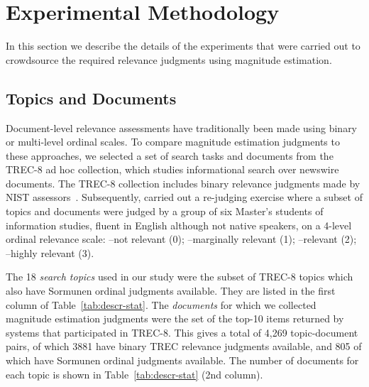 \section{Experimental Methodology}
\label{sec-methods}

In this section we describe the details of the experiments that were
carried out to crowdsource
the required relevance judgments using magnitude estimation.

\subsection{Topics and Documents}

Document-level relevance assessments have traditionally been made using
binary or multi-level ordinal scales.
To compare magnitude estimation judgments to these approaches, we
selected a set of search tasks and documents from the TREC-8 ad hoc
collection, which studies informational search over newswire documents.
The TREC-8 collection includes binary relevance judgments made by
NIST assessors~\cite{VooHar99}. Subsequently, \citet{Sormunen:2002} carried out a
re-judging exercise where a subset of topics and documents were judged
by a group of six Master's students of information studies, fluent in English although not native speakers,
on a 4-level ordinal relevance scale: \nn--not relevant (0);  
\mm--marginally relevant (1); \rr--relevant (2); \hh--highly relevant
(3).

The 18 \emph{search topics} used in our study were the subset of TREC-8 topics
which also have Sormunen ordinal judgments available. 
They are listed in the first column of Table~\ref{tab:descr-stat}.
The \emph{documents} for which we collected magnitude estimation
judgments were the set of the top-10 items returned by systems that
participated in TREC-8.  
This gives a total of 4,269 topic-document pairs, of
which 3881 have binary TREC relevance judgments available, and 805 
of which have Sormunen ordinal judgments available.
The number of documents for each topic is shown in 
Table~\ref{tab:descr-stat} (2nd column). 

